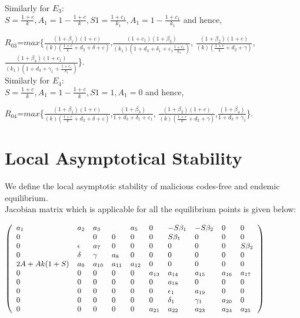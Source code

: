 \noindent Similarly for $E_3:$\\
$S=\frac{1+c}{k}, A_1=1-\frac{1+c}{k},S1=\frac{1+c_1}{k_1},A_1=1-\frac{1+c_1}{k_1}$ and hence,

$R_{03}$=$max$\{$\frac{(1+{\beta}_1)(1+c)}{(k)(\frac{1+c}{k}+d_2+\delta+\varepsilon)}$,$\frac{(1+c_1)(1+{\beta}_3)}{(k_1)(1+d_3+{\delta}_1+{\varepsilon}_1\frac{1+c_1}{k_1})}$,
$\frac{(1+{\beta}_2)(1+c)}{(k)(\frac{1+c}{k}+d_2+\gamma)}$,$\frac{(1+{\beta}_4)(1+c_1)}{(k_1)(1+d_3+{\gamma}_1+\frac{1+c_1}{k_1})}$\}.\\

\noindent Similarly for $E_4:$\\
$S=\frac{1+c}{k},A_1=1-\frac{1+c}{k},S1=1,A_1=0$ and hence,

$R_{04}$=$max$\{$\frac{(1+{\beta}_1)(1+c)}{(k)(\frac{1+c}{k}+d_2+\delta+\varepsilon)}$,$\frac{(1+{\beta}_3)}{1+d_3+{\delta}_1+{\varepsilon}_1}$,
$\frac{(1+{\beta}_2)(1+c)}{(k)(\frac{1+c}{k}+d_2+\gamma)}$,$\frac{(1+{\beta}_4)}{1+d_3+{\gamma}_1}$\}.

\section{Local Asymptotical Stability}

We define the local asymptotic stability of malicious codes-free and endemic equilibrium.\\
\noindent Jacobian matrix which is applicable for all the equilibrium points is given below:

\noindent
\begin{math}
\small\left(
        \begin{array}{llllllllll}
           a_1& a_2 & a_3 &  & a_5 & 0 &-S \beta_{1} &-S \beta_{2} & 0 & 0 \\
          0 &  & 0 & 0 & 0 & 0  & S \beta_{1} & 0 & 0 & 0\\
          0 & \epsilon & a_7 & 0 & 0 & 0 & 0 & 0 & 0 & S \beta_{2} \\
          0 & \delta & \gamma & a_8 & 0 & 0 & 0 & 0 & 0 & 0 \\
          2A+Ak(1+S) & a_9 & a_{10} & a_{11} & a_{12} & 0 & 0 & 0 & 0 & 0 \\
          0 & 0 & 0 & 0 & 0 & a_{13} & a_{14} & a_{15} & a_{16} & a_{17}  \\
          0 & 0 & 0 & 0 & 0 & 0 & a_{18} & 0 & 0 & 0 \\
          0 & 0 & 0 & 0 & 0 & 0 & \epsilon_{1} & a_{19} & 0 & 0  \\
          0 & 0 & 0 & 0 & 0 & 0 & \delta_{1} & \gamma_{1} & a_{20} & 0  \\
          0 & 0 & 0 & 0 & 0 & a_{21} & a_{22} & a_{23} & a_{24} & a_{25}  \\
        \end{array}
      \right)\normalsize
\end{math}

